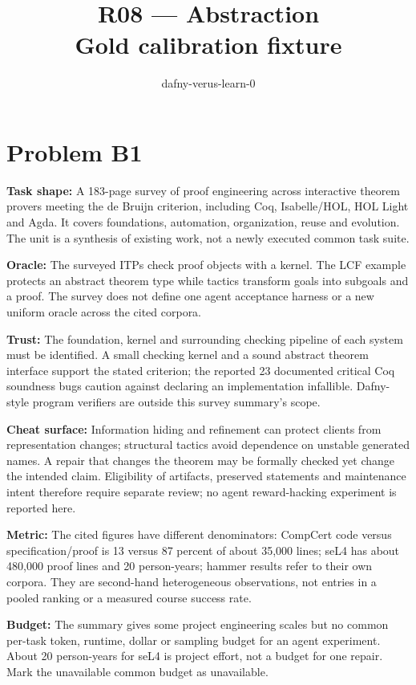 \documentclass[11pt]{article}
\title{R08 --- Abstraction \\ \large Gold calibration fixture}
\author{dafny-verus-learn-0}
\date{}
\begin{document}
\maketitle
\section*{Problem B1}\label{ans:B1}
\begin{answer}
\textbf{Task shape:} A 183-page survey of proof engineering across interactive theorem provers meeting the de Bruijn criterion, including Coq, Isabelle/HOL, HOL Light and Agda. It covers foundations, automation, organization, reuse and evolution. The unit is a synthesis of existing work, not a newly executed common task suite.

\textbf{Oracle:} The surveyed ITPs check proof objects with a kernel. The LCF example protects an abstract theorem type while tactics transform goals into subgoals and a proof. The survey does not define one agent acceptance harness or a new uniform oracle across the cited corpora.

\textbf{Trust:} The foundation, kernel and surrounding checking pipeline of each system must be identified. A small checking kernel and a sound abstract theorem interface support the stated criterion; the reported 23 documented critical Coq soundness bugs caution against declaring an implementation infallible. Dafny-style program verifiers are outside this survey summary's scope.

\textbf{Cheat surface:} Information hiding and refinement can protect clients from representation changes; structural tactics avoid dependence on unstable generated names. A repair that changes the theorem may be formally checked yet change the intended claim. Eligibility of artifacts, preserved statements and maintenance intent therefore require separate review; no agent reward-hacking experiment is reported here.

\textbf{Metric:} The cited figures have different denominators: CompCert code versus specification/proof is 13 versus 87 percent of about 35,000 lines; seL4 has about 480,000 proof lines and 20 person-years; hammer results refer to their own corpora. They are second-hand heterogeneous observations, not entries in a pooled ranking or a measured course success rate.

\textbf{Budget:} The summary gives some project engineering scales but no common per-task token, runtime, dollar or sampling budget for an agent experiment. About 20 person-years for seL4 is project effort, not a budget for one repair. Mark the unavailable common budget as unavailable.


\end{answer}
\end{document}
